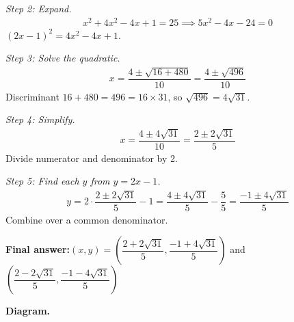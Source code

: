 \documentclass[11pt]{article}
\begin{document}
\textit{Step 2: Expand.}
\[\begin{gathered}
x^2 + 4x^2 - 4x + 1 = 25 \implies 5x^2 - 4x - 24 = 0
\end{gathered}\]
\( (2x-1)^2 = 4x^2 - 4x + 1 \).

\textit{Step 3: Solve the quadratic.}
\[\begin{gathered}
x = \dfrac{4 \pm \sqrt{16 + 480}}{10} = \dfrac{4 \pm \sqrt{496}}{10}
\end{gathered}\]
Discriminant \( 16 + 480 = 496 = 16 \times 31 \), so \( \sqrt{496} = 4\sqrt{31} \).

\textit{Step 4: Simplify.}
\[\begin{gathered}
x = \dfrac{4 \pm 4\sqrt{31}}{10} = \dfrac{2 \pm 2\sqrt{31}}{5}
\end{gathered}\]
Divide numerator and denominator by 2.

\textit{Step 5: Find each \( y \) from \( y = 2x - 1 \).}
\[\begin{gathered}
y = 2 \cdot \dfrac{2 \pm 2\sqrt{31}}{5} - 1 = \dfrac{4 \pm 4\sqrt{31}}{5} - \dfrac{5}{5} = \dfrac{-1 \pm 4\sqrt{31}}{5}
\end{gathered}\]
Combine over a common denominator.

\begin{answerbox}
\textbf{Final answer:}\quad \(\displaystyle (x, y) = \left(\dfrac{2 + 2\sqrt{31}}{5}, \dfrac{-1 + 4\sqrt{31}}{5}\right)\) and \(\displaystyle \left(\dfrac{2 - 2\sqrt{31}}{5}, \dfrac{-1 - 4\sqrt{31}}{5}\right)\)
\end{answerbox}
\textbf{Diagram.}
\end{document}
